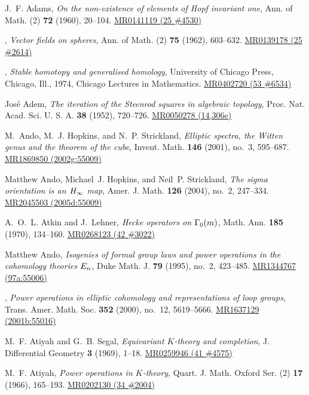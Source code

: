\documentclass{gtpart}
\theoremstyle{definition}
\theoremstyle{remark}
\numberwithin{equation}{section}
\numberwithin{thm}{section}
\begin{document}
\newpage
\newcommand{\MRn}[2]{\href{http://www.ams.org/mathscinet-getitem?mr=#1}{MR#1 #2}}
\begin{thebibliography}

J.~F. Adams, \emph{On the non-existence of elements of {H}opf invariant one},
  Ann. of Math. (2) \textbf{72} (1960), 20--104. \MRn{0141119}{(25 \#4530)}

\bysame, \emph{Vector fields on spheres}, Ann. of Math. (2) \textbf{75} (1962),
  603--632. \MRn{0139178}{(25 \#2614)}

\bysame, \emph{Stable homotopy and generalised homology}, University of Chicago
  Press, Chicago, Ill., 1974, Chicago Lectures in Mathematics. \MRn{0402720}{(53
  \#6534)}

Jos{\'e} Adem, \emph{The iteration of the {S}teenrod squares in algebraic
  topology}, Proc. Nat. Acad. Sci. U. S. A. \textbf{38} (1952), 720--726.
  \MRn{0050278}{(14,306e)}

M.~Ando, M.~J. Hopkins, and N.~P. Strickland, \emph{Elliptic spectra, the
  {W}itten genus and the theorem of the cube}, Invent. Math. \textbf{146}
  (2001), no.~3, 595--687. \MRn{1869850}{(2002g:55009)}

Matthew Ando, Michael~J. Hopkins, and Neil~P. Strickland, \emph{The sigma
  orientation is an {$H\sb \infty$} map}, Amer. J. Math. \textbf{126} (2004),
  no.~2, 247--334. \MRn{2045503}{(2005d:55009)}

A.~O.~L. Atkin and J.~Lehner, \emph{Hecke operators on {$\Gamma \sb{0}(m)$}},
  Math. Ann. \textbf{185} (1970), 134--160. \MRn{0268123}{(42 \#3022)}

Matthew Ando, \emph{Isogenies of formal group laws and power operations in the
  cohomology theories {$E\sb n$}}, Duke Math. J. \textbf{79} (1995), no.~2,
  423--485. \MRn{1344767}{(97a:55006)}

\bysame, \emph{Power operations in elliptic cohomology and representations of
  loop groups}, Trans. Amer. Math. Soc. \textbf{352} (2000), no.~12,
  5619--5666. \MRn{1637129}{(2001b:55016)}

M.~F. Atiyah and G.~B. Segal, \emph{Equivariant {$K$}-theory and completion},
  J. Differential Geometry \textbf{3} (1969), 1--18. \MRn{0259946}{(41 \#4575)}

M.~F. Atiyah, \emph{Power operations in {$K$}-theory}, Quart. J. Math. Oxford
  Ser. (2) \textbf{17} (1966), 165--193. \MRn{0202130}{(34 \#2004)}


\end{thebibliography}
\end{document}
